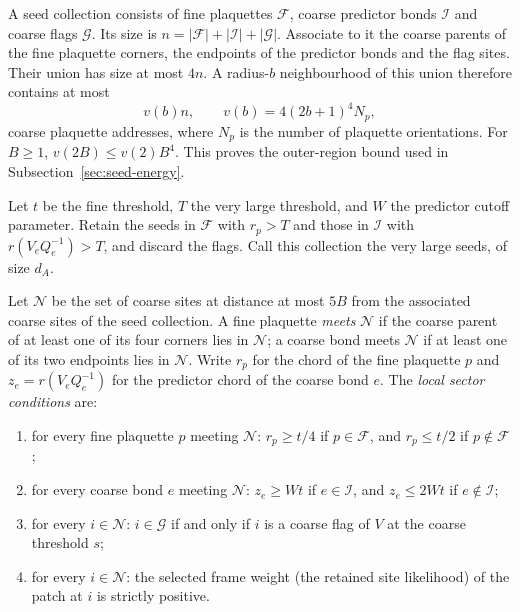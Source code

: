 A seed collection consists of fine plaquettes $\mathcal F$, coarse
predictor bonds $\mathcal I$ and coarse flags $\mathcal G$. Its size
is $n=|\mathcal F|+|\mathcal I|+|\mathcal G|$. Associate to it the
coarse parents of the fine plaquette corners, the endpoints of the
predictor bonds and the flag sites. Their union has size at most
$4n$. A radius-$b$ neighbourhood of this union therefore contains at
most
\[
 v(b)n,\qquad v(b)=4(2b+1)^4 N_p,
\]
coarse plaquette addresses, where $N_p$ is the number of plaquette
orientations. For $B\ge1$, $v(2B)\le v(2)B^4$. This proves the
outer-region bound used in Subsection~\ref{sec:seed-energy}.

Let $t$ be the fine threshold, $T$ the very large threshold, and $W$
the predictor cutoff parameter. Retain the seeds in $\mathcal F$
with $r_p>T$ and those in $\mathcal I$ with
$r(V_eQ_e^{-1})>T$, and discard the flags. Call this collection the
very large seeds, of size $d_A$.

\begin{definition}\label{def:geometry-sector-conditions}
Let $\mathcal N$ be the set of coarse sites at distance at most $5B$
from the associated coarse sites of the seed collection. A fine
plaquette \emph{meets} $\mathcal N$ if the coarse parent of at least one
of its four corners lies in $\mathcal N$; a coarse bond meets $\mathcal N$
if at least one of its two endpoints lies in $\mathcal N$. Write $r_p$
for the chord of the fine plaquette $p$ and
$z_e=r(V_eQ_e^{-1})$ for the predictor chord of the coarse bond $e$.
The \emph{local sector conditions} are:
\begin{enumerate}
\item[(S1)] for every fine plaquette $p$ meeting $\mathcal N$:
  $r_p\ge t/4$ if $p\in\mathcal F$, and $r_p\le t/2$ if $p\notin\mathcal F$;
\item[(S2)] for every coarse bond $e$ meeting $\mathcal N$:
  $z_e\ge Wt$ if $e\in\mathcal I$, and $z_e\le2Wt$ if $e\notin\mathcal I$;
\item[(S3)] for every $i\in\mathcal N$: $i\in\mathcal G$ if and only if
  $i$ is a coarse flag of $V$ at the coarse threshold $s$;
\item[(S4)] for every $i\in\mathcal N$: the selected frame weight
  (the retained site likelihood) of the patch at $i$ is strictly positive.
\end{enumerate}
\end{definition}

